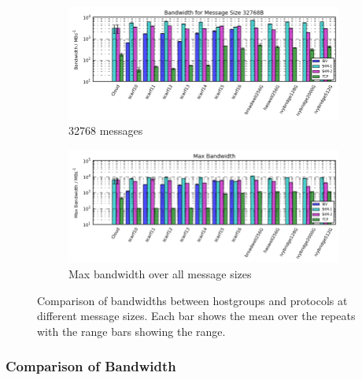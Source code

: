\documentclass{article}
\begin{document}
             \begin{figure}[H]\ContinuedFloat
                \centering
                \begin{subfigure}{\textwidth}
                  \centering
                    \includegraphics[width=\textwidth]{compare_bandwidth-hostgroup_32768}
                  \caption{32768\si{\byte} messages}
                \end{subfigure}

                \begin{subfigure}{\textwidth}
                  \centering
                    \includegraphics[width=\textwidth]{compare_bandwidth-hostgroup_max}

                  \caption{Max bandwidth over all message sizes}
                \end{subfigure}
                \caption{Comparison of bandwidths between hostgroups and protocols at different message sizes. Each bar shows the mean over the repeats with the range bars showing the range.}
                \label{fig:compare_bandwidth-hostgroup_max}
             \end{figure}



        \subsubsection{Comparison of Bandwidth}
            \label{analyse-results-imb-bandwidth}
\end{document}

